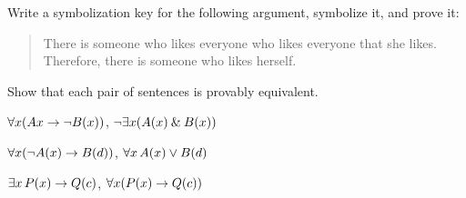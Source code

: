 \solutions
\problempart
\label{pr.likes}
Write a symbolization key for the following argument, symbolize it, and prove it:
\begin{quote}
There is someone who likes everyone who likes everyone that she likes. Therefore, there is someone who likes herself.
\end{quote}

\problempart
Show that each pair of sentences is provably equivalent.
\begin{earg}
\item $\forall x (Ax\rightarrow \neg \mathord{B}(x))$, $\neg\exists x(\mathord{A}(x) \mathbin{\&} \mathord{B}(x))$
\item $\forall x (\neg \mathord{A}(x)\rightarrow \mathord{B}(d))$, $\forall x\,\mathord{A}(x) \vee \mathord{B}(d)$
\item $\exists x\,\mathord{P}(x) \rightarrow \mathord{Q}(c)$, $\forall x (\mathord{P}(x) \rightarrow \mathord{Q}(c))$
\end{earg}


